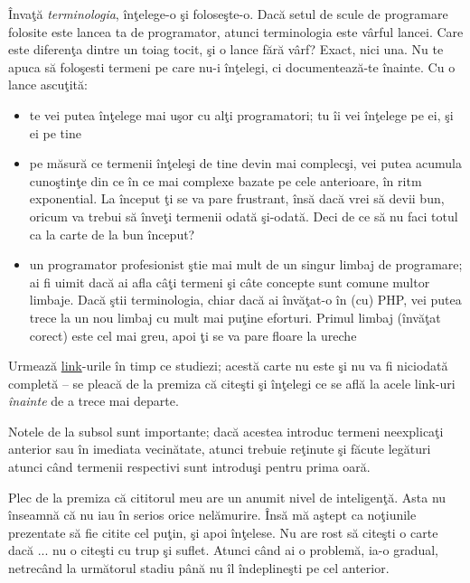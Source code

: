 Învaţă \textit{terminologia}, înţelege-o şi foloseşte-o. Dacă setul de scule de programare folosite
este lancea ta de programator, atunci terminologia este vârful lancei.
Care este diferenţa dintre un toiag tocit, şi o lance fără vârf?
Exact, nici una. Nu te apuca să foloşesti termeni pe care nu-i înţelegi,
ci documentează-te înainte. Cu o lance ascuţită:
\begin{itemize}
	\item te vei putea înţelege mai uşor cu alţi programatori; tu îi vei înţelege pe ei, şi ei pe tine
	\item pe măsură ce termenii înţeleşi de tine devin mai complecşi,
		  vei putea acumula cunoştinţe din ce în ce mai complexe bazate pe cele anterioare,
		  în ritm exponential. La început ţi se va pare frustrant, însă dacă vrei să devii bun,
		  oricum va trebui să înveţi termenii odată şi-odată. Deci de ce să nu faci totul ca
		  la carte de la bun început?
	\item un programator profesionist ştie mai mult de un singur limbaj de programare; ai fi
		  uimit dacă ai afla câţi termeni şi câte concepte sunt comune multor limbaje. Dacă
		  ştii terminologia, chiar dacă ai învăţat-o în (cu) PHP, vei putea trece la un nou
		  limbaj cu mult mai puţine eforturi. Primul limbaj (învăţat corect) este cel mai greu,
		  apoi ţi se va pare floare la ureche
\end{itemize}


Urmează \href{http://en.wikipedia.org/wiki/Hyperlink}{link}-urile în timp ce
studiezi;
acestă carte nu este şi nu va fi niciodată {\glqq}completă{\grqq} -- se pleacă de la premiza
că citeşti şi înţelegi ce se află la acele link-uri \textit{înainte} de a trece
mai departe.

Notele de la subsol sunt importante; dacă acestea introduc termeni neexplicaţi
anterior sau în imediata vecinătate, atunci trebuie reţinute şi făcute
legături atunci când termenii respectivi sunt introduşi pentru prima oară.

Plec de la premiza că cititorul meu are un anumit nivel de inteligenţă.
Asta nu înseamnă că nu iau în serios orice nelămurire. Însă mă aştept
ca noţiunile prezentate să fie citite cel puţin, şi apoi înţelese.
Nu are rost să citeşti o carte dacă ... nu o citeşti cu trup şi suflet.
Atunci când ai o problemă, ia-o gradual, netrecând la următorul stadiu
până nu îl îndeplineşti pe cel anterior.


